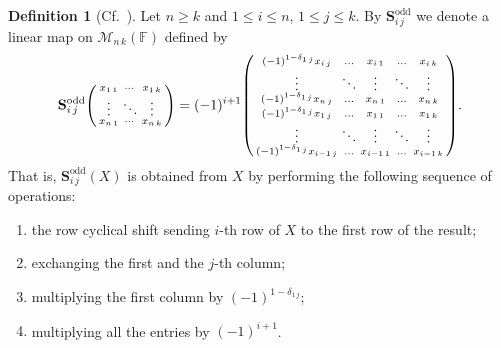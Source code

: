 \documentclass{elsarticle}
\def\F{{\mathbb F}}
\def\M{{\mathcal M}}
\def\SCS{{\mathbf S}}
\newenvironment{psmallmatrix}
  {\left(\begin{smallmatrix}}
  {\end{smallmatrix}\right)}
\theoremstyle{definition}
\newtheorem{definition}[theorem]{Definition}
\numberwithin{equation}{section}
\begin{document}
\begin{definition}[{Cf.~\cite[Definition~3.4]{Guterman2025b}}]\label{def:SCSDefOdd}Let $n \ge k$ and $1 \le i \le n$, $1 \le j \le k$. By $\SCS^{\mathrm{odd}}_{i\,j}$ we denote a linear map on $\M_{n\,k}(\F)$ defined by 
\begin{equation*}
\SCS^{\mathrm{odd}}_{i\,j}\begin{psmallmatrix}
x_{1\,1} & \cdots  & x_{1\,k}\\
  \vdots & \ddots & \vdots\\
x_{n\,1} & \cdots & x_{n\,k}\\
\end{psmallmatrix}= (-1)^{i+1}\begin{psmallmatrix}
(-1)^{1 - \delta_{1\,j}}x_{i\, j} & \ldots & x_{i\,1} & \ldots & x_{i\, k}\\
\vdots & \ddots & \vdots & \ddots  & \vdots\\
(-1)^{1 - \delta_{1\,j}}x_{n\, j} & \ldots & x_{n\,1} & \ldots & x_{n\, k}\\
(-1)^{1 - \delta_{1\,j}}x_{1\, j} & \ldots &  x_{1\,1} & \ldots & x_{1\, k}\\
\vdots & \ddots & \vdots & \ddots & \vdots\\
(-1)^{1 - \delta_{1\,j}}x_{i-1\, j} & \ldots & x_{i-1\,1} & \ldots &  x_{i-1\, k}
\end{psmallmatrix}.
\end{equation*}
That is, $\SCS^{\mathrm{odd}}_{i\,j}(X)$ is obtained from $X$ by performing the following sequence of operations:
\begin{enumerate}
\item the row cyclical shift sending $i$-th row of $X$ to the first row of the result;
\item exchanging the first and the $j$-th column;
\item multiplying the first column  by $(-1)^{1 - \delta_{1\,j}}$;
\item multiplying all the entries by $(-1)^{i+1}$.
\end{enumerate}
\end{definition}
\end{document}
